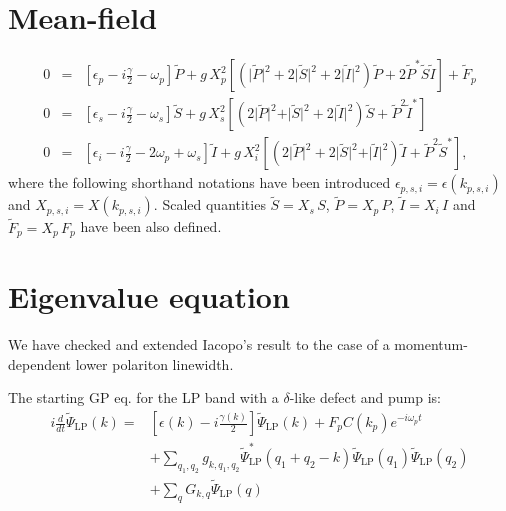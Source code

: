 \documentclass[a4paper,prb,10pt,aps,twocolumn]{revtex4-1}
\begin{document}
\section{Mean-field}
\label{sec:mf}

\begin{eqnarray}
0&=&%
\left[ \epsilon_p-i\frac{\gamma}{2}-\omega _{p}\right] \tilde{P}+
g\,X_{p}^{2}\left[\left( \vert
\tilde{P}\vert ^{2}+2\vert \tilde{S}\vert ^{2}+2\vert \tilde{I}\vert
^{2}\right) \tilde{P}+2\tilde{P}^{\ast
}\tilde{S}\tilde{I}\right]+\tilde{F}_{p}
  \label{eq:mf1} \\
0&=&
\left[ \epsilon_s-i\frac{\gamma}{2}-\omega _{s}\right] \tilde{S}+
g\,X_{s}^{2}\left[\left( 2\vert
\tilde{P}\vert ^{2}+\vert \tilde{S}\vert ^{2}+2\vert \tilde{I}\vert
^{2}\right) \tilde{S}+\tilde{P}^{2}\tilde{I}^{\ast }\right]  \label{eq:mf2} \\
0&=&
\left[ \epsilon_{i}-i\frac{\gamma}{2}-2\omega _{p}+\omega
  _{s}\right] \tilde{I}+
g\,X_{i}^{2}\left[\left( 
2\vert \tilde{P}\vert ^{2}+2\vert \tilde{S}\vert ^{2}+\vert
\tilde{I}\vert ^{2}\right) \tilde{I}+\tilde{P}^{2}\tilde{S}^{\ast }\right],  
\label{eq:mf3}
\end{eqnarray}%
where the following shorthand notations have been introduced
$\epsilon_{p,s,i}=\epsilon(k_{p,s,i})$ and
$X_{p,s,i}=X(k_{p,s,i})$. 
Scaled quantities $\tilde{S}= X_{s}\, S$,  $\tilde{P}= X_{p}\, P$,
$\tilde{I}= X_{i}\, I$ and 
$\tilde{F}_{p}=X_p\,F_{p}$ have been also defined.


\section{Eigenvalue equation}
\label{sec:eigv}

We have checked and extended Iacopo's result to the case of a momentum-dependent 
lower polariton linewidth.

The starting GP eq. for the LP band with a $\delta$-like defect and pump is:
\begin{align}
i \frac{d}{dt} \widetilde{\Psi}_{\text{LP}}(k)=&\left[\epsilon(k)-i 
\frac{\gamma(k)}{2}\right]\widetilde{\Psi}_{\text{LP}}(k) + F_p C(k_p) e^{-i 
\omega_p t} \nonumber \\
& + \sum_{q_1,q_2} g_{k,q_1,q_2} \widetilde{\Psi}^{*}_{\text{LP}}(q_1+q_2-
k)\widetilde{\Psi}_{\text{LP}}(q_1)\widetilde{\Psi}_{\text{LP}}(q_2) \nonumber \\
& + \sum_q G_{k,q} \widetilde{\Psi}_{\text{LP}}(q)
\end{align}
\end{document}
